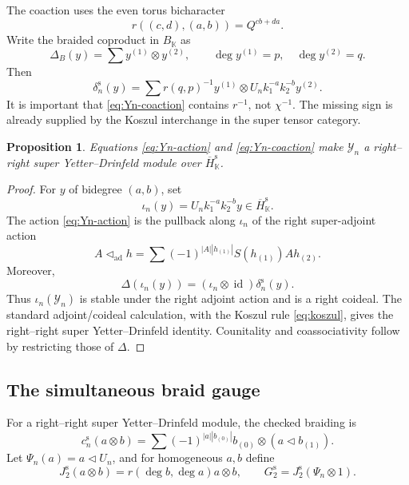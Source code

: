 \documentclass[11pt,a4paper]{article}
\newcommand{\hK}{\mathbb K}
\newcommand{\ot}{\otimes}
\newcommand{\tri}{\mathbin{\triangleleft}}
\newcommand{\id}{\operatorname{id}}
\newtheorem{proposition}[theorem]{Proposition}
\theoremstyle{definition}
\theoremstyle{remark}
\begin{document}
The coaction uses the even torus bicharacter
\begin{equation}\label{eq:r}
 r((c,d),(a,b))=Q^{cb+da}.
\end{equation}
Write the braided coproduct in \(B_{\hK}\) as
\[
 \Delta_B(y)=\sum y^{(1)}\ot y^{(2)},\qquad
 \deg y^{(1)}=p,\quad \deg y^{(2)}=q.
\]
Then
\begin{equation}\label{eq:Yn-coaction}
 \delta_n^{\mathrm s}(y)
 =
 \sum r(q,p)^{-1}y^{(1)}\ot
 U_nk_1^{-a}k_2^{-b}y^{(2)}.
\end{equation}
It is important that \eqref{eq:Yn-coaction} contains \(r^{-1}\), not
\(\chi^{-1}\).  The missing sign is already supplied by the Koszul
interchange in the super tensor category.

\begin{proposition}\label{prop:YD}
Equations \eqref{eq:Yn-action} and \eqref{eq:Yn-coaction} make
\(\mathcal Y_n\) a right--right super Yetter--Drinfeld module over
\(\overline H_{\hK}^{\mathrm s}\).
\end{proposition}

\begin{proof}
For \(y\) of bidegree \((a,b)\), set
\[
 \iota_n(y)=U_nk_1^{-a}k_2^{-b}y\in\overline H_{\hK}^{\mathrm s}.
\]
The action \eqref{eq:Yn-action} is the pullback along \(\iota_n\) of the
right super-adjoint action
\[
 A\tri_{\mathrm{ad}}h
 =\sum(-1)^{|A||h_{(1)}|}S(h_{(1)})Ah_{(2)}.
\]
Moreover,
\[
 \Delta(\iota_n(y))=(\iota_n\ot\id)\delta_n^{\mathrm s}(y).
\]
Thus \(\iota_n(\mathcal Y_n)\) is stable under the right adjoint action
and is a right coideal.  The standard adjoint/coideal calculation, with
the Koszul rule \eqref{eq:koszul}, gives the right--right super
Yetter--Drinfeld identity.  Counitality and coassociativity follow by
restricting those of \(\Delta\).
\end{proof}

\subsection{The simultaneous braid gauge}

For a right--right super Yetter--Drinfeld module, the checked braiding is
\begin{equation}\label{eq:YD-braiding}
 c_n^{\mathrm s}(a\ot b)
 =\sum(-1)^{|a||b_{(0)}|}
 b_{(0)}\ot(a\tri b_{(1)}).
\end{equation}
Let \(\Psi_n(a)=a\tri U_n\), and for homogeneous \(a,b\) define
\[
 J_2^{\mathrm s}(a\ot b)=r(\deg b,\deg a)a\ot b,\qquad
 G_2^{\mathrm s}=J_2^{\mathrm s}(\Psi_n\ot1).
\]
\end{document}

